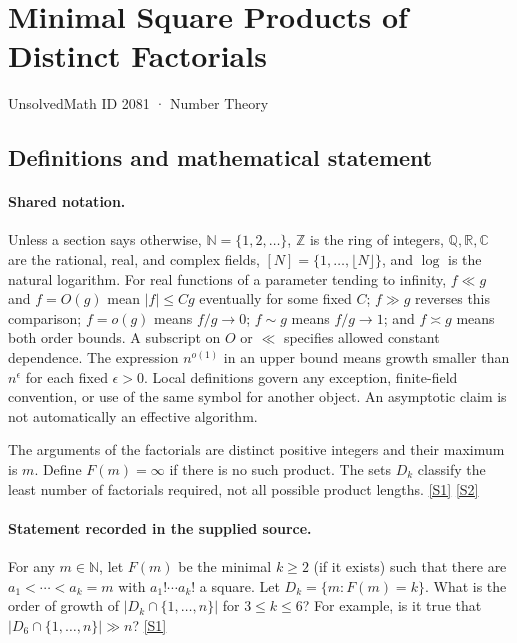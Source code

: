 \documentclass[11pt,a4paper]{article}
\newcommand{\N}{\mathbb{N}}
\newcommand{\Z}{\mathbb{Z}}
\newcommand{\Q}{\mathbb{Q}}
\newcommand{\R}{\mathbb{R}}
\newcommand{\C}{\mathbb{C}}
\newcommand{\sref}[2]{\hyperlink{source:#1:#2}{[S#2]}}
\begin{document}

\setcounter{section}{2080}

\section{Minimal Square Products of Distinct Factorials}\label{2081}

{\small\sffamily UnsolvedMath ID 2081 · Number Theory}

\subsection{Definitions and mathematical statement}

\paragraph{Shared notation.}Unless a section says otherwise, $\N=\{1,2,\ldots\}$,
$\Z$ is the ring of integers, $\Q,\R,\C$ are the rational, real, and complex
fields, $[N]=\{1,\ldots,\lfloor N\rfloor\}$, and $\log$ is the natural
logarithm. For real functions of a parameter tending to infinity,
$f\ll g$ and $f=O(g)$ mean $|f|\leq Cg$ eventually for some fixed $C$;
$f\gg g$ reverses this comparison; $f=o(g)$ means $f/g\to0$;
$f\sim g$ means $f/g\to1$; and $f\asymp g$ means both order bounds.
A subscript on $O$ or $\ll$ specifies allowed constant dependence.
The expression $n^{o(1)}$ in an upper bound means growth smaller than
$n^\epsilon$ for each fixed $\epsilon>0$. Local definitions govern any
exception, finite-field convention, or use of the same symbol for another
object. An asymptotic claim is not automatically an effective algorithm.



The arguments of the factorials are distinct positive integers and their maximum is $m$. Define $F(m)=\infty$ if there is no such product. The sets $D_k$ classify the least number of factorials required, not all possible product lengths. \sref{2081}{1} \sref{2081}{2}

\paragraph{Statement recorded in the supplied source.}
For any $m\in \mathbb{N}$, let $F(m)$ be the minimal $k\geq 2$ (if it exists) such that there are $a_1<\cdots <a_k=m$ with $a_1!\cdots a_k!$ a square. Let $D_k=\{ m : F(m)=k\}$. What is the order of growth of $\lvert D_k\cap\{1,\ldots,n\}\rvert$ for $3\leq k\leq 6$? For example, is it true that $\lvert D_6\cap \{1,\ldots,n\}\rvert \gg n$? \sref{2081}{1}
\end{document}
